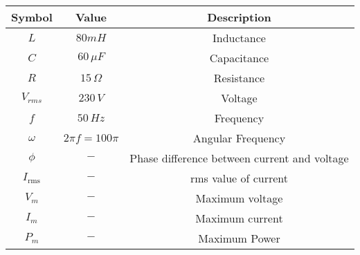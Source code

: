 \begin{tabular}{|c|c|c|}
	\hline
	\textbf{Symbol} & \textbf{Value} &
	\textbf{Description}\\[6pt]
	\hline
	$L$ &  $80mH$ & Inductance\\[6pt]
	\hline 
	$C$ &  $60\, \mu F$ & Capacitance \\[6pt]
	\hline
	$R$ &  $15\, \Omega$ & Resistance\\[6pt]
	\hline
	$V_{rms}$ & $230\, V$ & Voltage\\[6pt]
	\hline
	$f$ & $50\, {Hz}$ & Frequency\\[6pt]
	\hline
	$\omega$ & $2\pi f=100\pi$ & Angular Frequency\\[6pt]
	\hline
	$\phi$ & $-$ & Phase difference between current and voltage\\[6pt]
	\hline
	$I_ \text{rms}$ & $-$ & rms value of current\\
	\hline
	$V_m$ & $-$ & Maximum voltage\\
	\hline
	$I_m$ & $-$ & Maximum current\\
	\hline
	$P_m$ & $-$ & Maximum Power\\
	\hline
\end{tabular}
